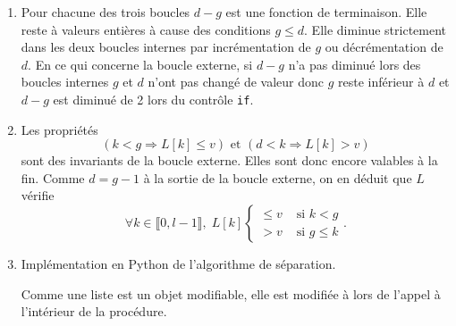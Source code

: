 \begin{enumerate}
  \item Pour chacune des trois boucles $d-g$ est une fonction de terminaison. Elle reste à valeurs entières à cause des conditions $g\leq d$. Elle diminue strictement dans les deux boucles internes par incrémentation de $g$ ou décrémentation de $d$. En ce qui concerne la boucle externe, si $d-g$ n'a pas diminué lors des boucles internes $g$ et $d$ n'ont pas changé de valeur donc $g$ reste inférieur à $d$ et $d-g$ est diminué de 2 lors du contrôle \texttt{if}.
  \item Les propriétés 
\begin{displaymath}
  \left( k < g \Rightarrow L[k] \leq v\right)  \text{ et } \left( d < k \Rightarrow L[k] > v\right) 
\end{displaymath}
sont des invariants de la boucle externe. Elles sont donc encore valables à la fin. Comme $d = g - 1$ à la sortie de la boucle externe, on en déduit que $L$ vérifie
\[
 \forall k \in \llbracket 0, l-1 \rrbracket, \;
 L[k]
 \left\lbrace 
 \begin{aligned}
  \leq v &\text{ si } k < g \\
  > v &\text{ si } g \leq k
 \end{aligned}
\right. .
\]

  \item Implémentation en Python de l'algorithme de séparation.

Comme une liste est un objet modifiable, elle est modifiée à lors de l'appel à l'intérieur de la procédure. 
\end{enumerate}

